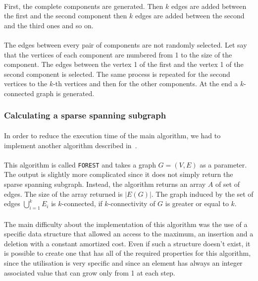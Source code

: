 \paragraph{}
First, the complete components are generated. Then $k$ edges are added between the 
first and the second component then $k$ edges are added between the second and the 
third ones and so on.

\paragraph{}
The edges between every pair of components are not randomly selected. Let say
that the
vertices of each component are numbered from 1 to the size of the component.
The edges between the vertex 1 of the first and the vertex 1 of the second 
component is selected. The same process is repeated for the second vertices to the
$k$-th vertices and then  for the other components. At the end a $k$-connected 
graph is generated.


 
\subsubsection{Calculating a sparse spanning subgraph}
\paragraph{}
In order to reduce the execution time of the main algorithm, we had to
implement another algorithm described in~\cite{NaIb92}.

\paragraph{}
This algorithm is called \verb!FOREST! and takes a graph $G=(V,E)$ as a parameter.
The output is slightly more complicated since it does not simply return the
sparse spanning subgraph. Instead, the algorithm returns an array $A$ of set of
edges. The size of the array returned is $|E(G)|$. The graph induced by the
set of edges $\bigcup \limits_{i=1}^k E_i$
is $k$-connected, if $k$-connectivity of $G$ is greater or equal to $k$.

\paragraph{}
The main difficulty about the implementation of this algorithm was the use of a
specific data structure that allowed an access to the maximum, an insertion and
a deletion with a constant amortized cost. Even if such a structure doesn't
exist, it is possible to create one that has all of the required properties for
this algorithm, since the utilisation is very specific and since an element has
always an integer associated value that can grow only from 1 at each step.


